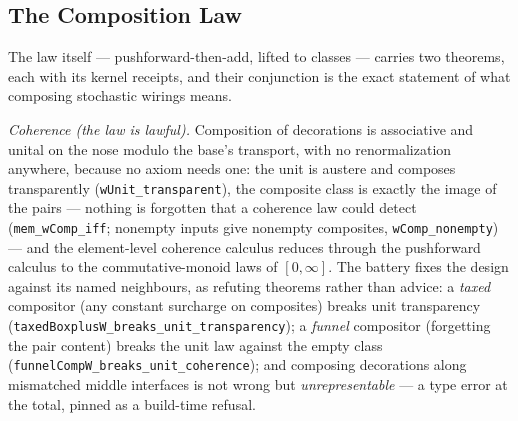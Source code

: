 \subsection{The Composition Law}

The law itself ---
pushforward-then-add, lifted to classes --- carries two
theorems, each with its kernel
receipts, and their conjunction is the exact statement of
what composing stochastic wirings means.

\emph{Coherence (the law is lawful).} Composition of decorations is
associative and unital on the nose modulo the base's transport,
with no renormalization anywhere, because no axiom needs one: the
unit is austere and composes transparently
(\texttt{wUnit\_transparent}), the composite class is exactly the
image of the pairs --- nothing is forgotten that a coherence law
could detect (\texttt{mem\_wComp\_iff}; nonempty inputs give
nonempty composites, \texttt{wComp\_nonempty}) --- and the
element-level coherence calculus reduces through the pushforward
calculus to the commutative-monoid laws of $[0,\infty]$. The
battery fixes the design against its named neighbours, as refuting
theorems rather than advice: a \emph{taxed} compositor (any
constant surcharge on composites) breaks unit transparency
(\texttt{taxedBoxplusW\_breaks\_unit\_transparency}); a
\emph{funnel} compositor (forgetting the pair content) breaks the
unit law against the empty class
(\texttt{funnelCompW\_breaks\_unit\_coherence}); and composing
decorations along mismatched middle interfaces is not wrong but
\emph{unrepresentable} --- a type error at the total, pinned as a
build-time refusal.

